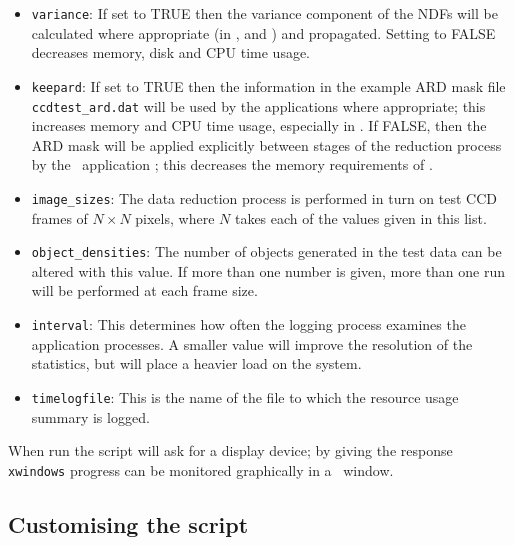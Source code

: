 \begin{itemize}
%
\item {\tt variance}: 
If set to TRUE then the variance component of the NDFs will be  
calculated where appropriate 
(in ,  and ) 
and propagated.
Setting to FALSE decreases memory, disk and CPU time usage.
%
\item {\tt keepard}:
If set to TRUE then the information in the example ARD mask file
{\tt ccdtest\_ard.dat} will be used by the 
{\CCDPref} applications where appropriate;
this increases memory and CPU time usage, especially in .
If FALSE, then the ARD mask will be applied explicitly 
between stages of the reduction process 
by the \KAPPAref\ application ;
this decreases the memory requirements of .
%
\item {\tt image\_sizes}:
The data reduction process is performed in turn on 
test CCD frames of $N \times N$ pixels, where $N$ takes each
of the values given in this list.
%
\item {\tt object\_densities}:
The number of objects generated in the test data can be altered
with this value.  If more than one number is given,  more than one
run will be performed at each frame size.
%
\item {\tt interval}:
This determines how often the logging process examines the 
application processes. 
A smaller value will improve the resolution of the statistics,
but will place a heavier load on the system.
%
\item {\tt timelogfile}:
This is the name of the file to which the resource usage summary is logged.
\end{itemize}

When run the script will ask for a display device;
by giving the response {\tt xwindows} progress
can be monitored graphically in a \GWMref\ window.


\subsection{Customising the script}
 \label{sec:adapt}


